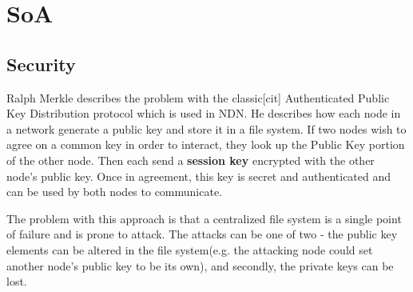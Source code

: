 \section{SoA}
\subsection{Security}
Ralph Merkle describes the problem with the classic[cit] Authenticated Public Key Distribution protocol which is used in NDN. He describes how each node in a network generate a public key and store it in a file system. If two nodes wish to agree on a common key in order to interact, they look up the Public Key portion of the other node. Then each send a \textbf{session key} encrypted with the other node's public key. Once in agreement, this key is secret and authenticated and can be used by both nodes to communicate. 

The problem with this approach is that a centralized file system is a single point of failure and is prone to attack. The attacks can be one of two - the public key elements can be altered in the file system(e.g. the attacking node could set another node's public key to be its own), and secondly, the private keys can be lost.

